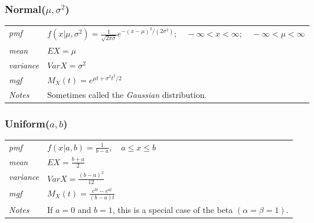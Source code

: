 \documentclass[12pt]{article}
\begin{document}
\subsubsection*{Normal($\mu, \sigma^2$)\cite[p. 625]{StatisticalInference}}
\begin{tabularx}{\textwidth}{ l X }
\emph{pmf} & $f(x|\mu, \sigma^2)=\frac{1}{\sqrt{2\pi \sigma}}e^{-(x-\mu)^2/(2\sigma^2)}; \quad -\infty < x < \infty; \quad -\infty < \mu < \infty$ \\
\emph{mean} & $EX = \mu$ \\
\emph{variance} & $Var X = \sigma^2$ \\
\emph{mgf} & $M_X(t)= e^{\mu t + \sigma^2t^2/2}$ \\
\emph{Notes} & Sometimes called the \emph{Gaussian} distribution.\\
\end{tabularx}

\subsubsection*{Uniform($a, b$)\cite[p. 626]{StatisticalInference}}
\begin{tabularx}{\textwidth}{ l X }
\emph{pmf} & $f(x|a, b)=\frac{1}{b-a}, \quad a \leq x \leq b$ \\
\emph{mean} & $EX = \frac{b+a}{2}$ \\
\emph{variance} & $Var X = \frac{(b-a)^2}{12}$ \\
\emph{mgf} & $M_X(t)=\frac{e^{bt}-e^{at}}{(b-a)t}$ \\
\emph{Notes} & If $a=0$ and $b=1$, this is a special case of the beta $(\alpha = \beta = 1)$.\\
\end{tabularx}

\newpage


\end{document}
